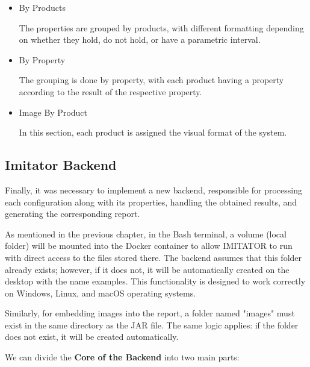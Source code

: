 \begin{itemize}
    \item By Products

    The properties are grouped by products, with different formatting depending on whether they hold, do not hold, or have a parametric interval.

    \item By Property

    The grouping is done by property, with each product having a property according to the result of the respective property.

    \item Image By Product

    In this section, each product is assigned the visual format of the system.
\end{itemize}


\subsection{Imitator Backend}

Finally, it was necessary to implement a new backend, responsible for processing each configuration along with its properties, handling the obtained results, and generating the corresponding report.

As mentioned in the previous chapter, in the Bash terminal, a volume (local folder) will be mounted into the Docker container to allow IMITATOR to run with direct access to the files stored there. The backend assumes that this folder already exists; however, if it does not, it will be automatically created on the desktop with the name examples. This functionality is designed to work correctly on Windows, Linux, and macOS operating systems.

Similarly, for embedding images into the report, a folder named "images" must exist in the same directory as the JAR file. The same logic applies: if the folder does not exist, it will be created automatically.

We can divide the \textbf{Core of the Backend} into two main parts:

